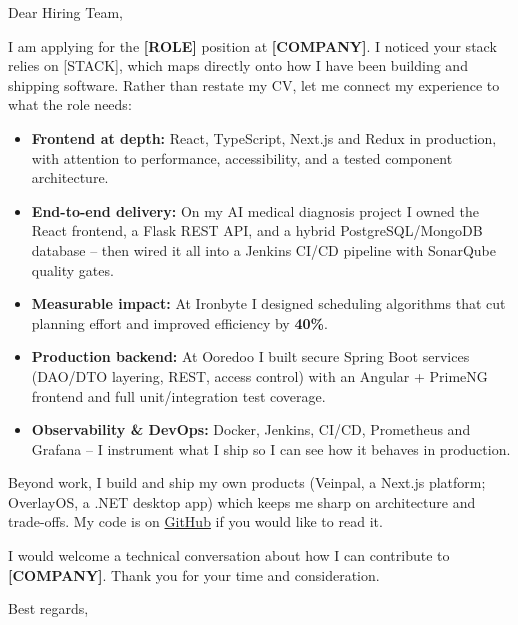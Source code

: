 \documentclass[11pt,a4paper]{letter}
\begin{document}
\begin{letter}{}

\opening{Dear Hiring Team,}

I am applying for the \textbf{[ROLE]} position at \textbf{[COMPANY]}. I noticed your stack
relies on [STACK], which maps directly onto how I have been building and shipping software.
Rather than restate my CV, let me connect my experience to what the role needs:

\begin{itemize}[leftmargin=1.2em, topsep=0.2em, itemsep=0.45em, parsep=0pt]
  \item \textbf{Frontend at depth:} React, TypeScript, Next.js and Redux in production,
        with attention to performance, accessibility, and a tested component architecture.
  \item \textbf{End-to-end delivery:} On my AI medical diagnosis project I owned the React
        frontend, a Flask REST API, and a hybrid PostgreSQL/MongoDB database -- then wired it
        all into a Jenkins CI/CD pipeline with SonarQube quality gates.
  \item \textbf{Measurable impact:} At Ironbyte I designed scheduling algorithms that cut
        planning effort and improved efficiency by \textbf{40\%}.
  \item \textbf{Production backend:} At Ooredoo I built secure Spring Boot services
        (DAO/DTO layering, REST, access control) with an Angular + PrimeNG frontend and
        full unit/integration test coverage.
  \item \textbf{Observability \& DevOps:} Docker, Jenkins, CI/CD, Prometheus and Grafana --
        I instrument what I ship so I can see how it behaves in production.
\end{itemize}

Beyond work, I build and ship my own products (Veinpal, a Next.js platform; OverlayOS, a
\mbox{.NET} desktop app) which keeps me sharp on architecture and trade-offs. My code is on
\href{https://github.com/YosrBennagra}{GitHub} if you would like to read it.

I would welcome a technical conversation about how I can contribute to \textbf{[COMPANY]}.
Thank you for your time and consideration.

\closing{Best regards,}

\end{letter}
\end{document}
